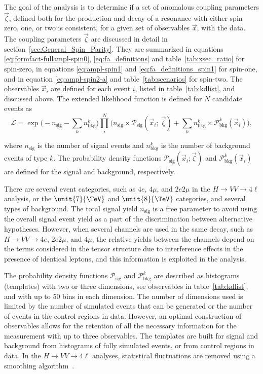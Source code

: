 The goal of the analysis is to determine if a set of anomalous coupling parameters $\vec{\zeta}$,
defined both for the production and decay of a resonance with either spin zero, one, or two
is consistent, for a given set of observables $\vec{x}$, with the data.
The coupling parameters $\vec{\zeta}$ are discussed in detail in section~\ref{sec:General_Spin_Parity}.
They are summarized in equations \eqref{eq:formfact-fullampl-spin0}, \eqref{eq:fa_definitions}
and table~\ref{tab:xsec_ratio} for spin-zero, in equations \eqref{eq:ampl-spin1} and \eqref{eq:fa_definitions_spin1} for spin-one, and in equation \eqref{eq:ampl-spin2-a} and table~\ref{tab:scenarios} for spin-two.
The observables $\vec{x}_i$ are defined for each event $i$, listed in table~\ref{tab:kdlist},
and discussed above. The extended likelihood function is defined for $N$ candidate events as
\begin{equation}
\mathcal{L} =  \exp\Big( - n_\text{sig}-\sum_k n_\text{bkg}^k  \Big)
\prod_i^{N} \Big( n_\text{sig} \times\mathcal{P}_\text{sig}(\vec{x}_{i};~\vec{\zeta})
+\sum_k n_\text{bkg}^{k} \times\mathcal{P}_\text{bkg}^k(\vec{x}_{i})
\Big),
\label{eq:likelihood}
\end{equation}

where $n_\text{sig}$ is the number of signal events and $n_\text{bkg}^k$ is the number of background events of type $k$.
The probability density functions $\mathcal{P}_\text{sig}(\vec{x}_{i};\vec{\zeta})$ and $\mathcal{P}_\text{bkg}^k(\vec{x}_{i})$
are defined for the signal and background, respectively.

There are several event categories, such as $4e$, $4\mu$, and $2e2\mu$ in the
$H\to VV \to 4\ell$ analysis, or the $\unit{7}{\TeV}$ and $\unit{8}{\TeV}$ categories, and several types of background.
The total signal yield $n_\text{sig}$ is a free parameter to avoid
using the overall signal event yield as a part of the discrimination between alternative hypotheses.
However, when several channels are used in the same decay,
such as $H \to VV \to 4e$, $2e2\mu$, and $4\mu$,
the relative yields between the channels depend on the terms considered in the tensor structure
due to interference effects in the presence of identical leptons,
and this information is exploited in the analysis.

The probability density functions $\mathcal{P}_\text{sig}$ and  $\mathcal{P}_\text{bkg}^k$ are described
as histograms (templates) with two or three dimensions, see observables in table~\ref{tab:kdlist},
and with up to 50 bins in each dimension. The number of dimensions used is limited by the number
of simulated events that can be generated or the number of events in the control regions in data.
However, an optimal construction of observables allows for the retention of all the necessary information for
the measurement with up to three observables. The templates are built for signal and background from
histograms of fully simulated events, or from control regions in data. In the $H\to VV \to 4\ell$ analyses, statistical fluctuations are removed using a smoothing algorithm~\cite{rosenblatt1956, parzen1962}.

